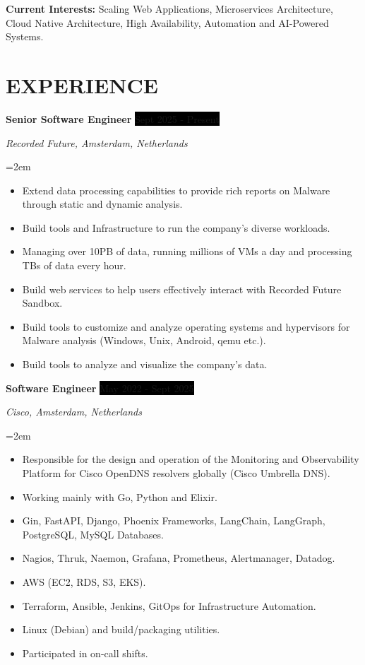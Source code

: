 \documentclass[paper=a4,fontsize=11pt]{scrartcl} %
\newcommand{\sepspace}{\vspace*{1em}}		%
\newcommand{\NewPart}[1]{\section*{\uppercase{#1}}}
\newcommand{\EducationEntry}[4]{
		\noindent \textbf{#1} \hfill      %
		\colorbox{Black}{%
			\parbox{6em}{%
			\hfill\color{White}#2}} \par  %
		\noindent \textit{#3} \par        %
		\noindent\hangindent=2em\hangafter=0 \small #4 %
		\normalsize \par}
\newcommand{\WorkEntry}[4]{				  %
		\noindent \textbf{#1} \hfill      %
		\colorbox{Black}{\color{White}#2} \par  %
		\noindent \textit{#3} \par              %
		\noindent\hangindent=2em\hangafter=0 \small #4 %
		\normalsize \par}
\begin{document}
\sepspace

\textbf{Current Interests:} Scaling Web Applications, Microservices Architecture, Cloud Native Architecture, High Availability, Automation and AI-Powered Systems.

\sepspace


\NewPart{Experience}{}

\WorkEntry{Senior Software Engineer}{Sept 2025 - Present}{Recorded Future, Amsterdam, Netherlands}{\begin{itemize}
\item Extend data processing capabilities to provide rich reports on Malware through static and dynamic analysis.
\item Build tools and Infrastructure to run the company's diverse workloads.
\item Managing over 10PB of data, running millions of VMs a day and processing TBs of data every hour.
\item Build web services to help users effectively interact with Recorded Future Sandbox.
\item Build tools to customize and analyze operating systems and hypervisors for Malware analysis (Windows, Unix, Android, qemu etc.).
\item Build tools to analyze and visualize the company's data.
\end{itemize}}
\sepspace

\WorkEntry{Software Engineer}{May 2022 - Sept 2025}{Cisco, Amsterdam, Netherlands}{\begin{itemize}
\item Responsible for the design and operation of the Monitoring and Observability Platform for Cisco OpenDNS resolvers globally (Cisco Umbrella DNS).
\item Working mainly with Go, Python and Elixir.
\item Gin, FastAPI, Django, Phoenix Frameworks, LangChain, LangGraph, PostgreSQL, MySQL Databases.
\item Nagios, Thruk, Naemon, Grafana, Prometheus, Alertmanager, Datadog.
\item AWS (EC2, RDS, S3, EKS).
\item Terraform, Ansible, Jenkins, GitOps for Infrastructure Automation.
\item Linux (Debian) and build/packaging utilities.
\item Participated in on-call shifts.
\end{itemize}}
\sepspace
\end{document}
